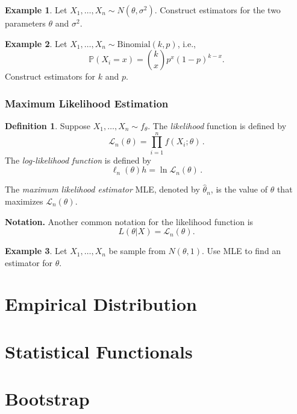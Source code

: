 \documentclass[
  openany]{book}
\theoremstyle{definition}
\newtheorem{definition}{Definition}[chapter]
\theoremstyle{definition}
\newtheorem{example}{Example}[chapter]
\theoremstyle{definition}
\theoremstyle{definition}
\theoremstyle{remark}
\begin{document}
\begin{example}
Let \(X_1, \dots, X_n \sim N(\theta, \sigma^2)\).
Construct estimators for the two parameters \(\theta\) and \(\sigma^2\).
\end{example}

\begin{example}
Let \(X_1, \dots, X_n \sim \mathrm{Binomial}(k,p)\), i.e.,
\[ \mathbb{P}(X_i = x) ={k \choose x} p^x (1-p)^{k-x}. \]
Construct estimators for \(k\) and \(p\).
\end{example}

\subsubsection{Maximum Likelihood Estimation}\label{maximum-likelihood-estimation}

\begin{definition}
Suppose \(X_1, \dots, X_n \sim f_\theta\).
The \emph{likelihood} function is defined by
\[ \mathcal{L}_n(\theta) = \prod_{i = 1}^n f (X_i; \theta) \,. \]
The \emph{log-likelihood function} is defined by
\[ \ell_n (\theta) h = \ln \mathcal{L}_n (\theta) \,. \]

The \emph{maximum likelihood estimator} MLE, denoted by \(\hat \theta_n\), is the value of
\(\theta\) that maximizes \(\mathcal{L}_n(\theta)\).
\end{definition}

\textbf{Notation.} Another common notation for the likelihood function is
\[ L(\theta| X) = \mathcal{L}_n(\theta).\]

\begin{example}
Let \(X_1, \dots, X_n\) be sample from \(N(\theta, 1)\).
Use MLE to find an estimator for \(\theta\).
\end{example}

\section{Empirical Distribution}\label{empirical-distribution}

\section{Statistical Functionals}\label{statistical-functionals}

\section{Bootstrap}\label{bootstrap}
\end{document}
